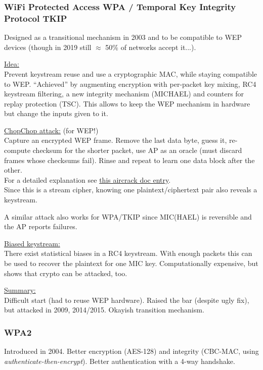 \subsubsection*{WiFi Protected Access WPA / Temporal Key Integrity Protocol TKIP}

Designed as a transitional mechanism in 2003 and to be compatible to WEP devices (though in 2019 still $\approx$ 50\% of networks accept it...).

\underline{Idea:}\\
Prevent keystream reuse and use a cryptographic MAC, while staying compatible to WEP.
``Achieved'' by augmenting encryption with per-packet key mixing, RC4 keystream filtering, a new integrity mechanism (MICHAEL) and counters for replay protection (TSC).
This allows to keep the WEP mechanism in hardware but change the inputs given to it.

\underline{ChopChop attack:} (for WEP!) \\
Capture an encrypted WEP frame.
Remove the last data byte, guess it, re-compute checksum for the shorter packet, use AP as an oracle (must discard frames whose checksums fail).
Rinse and repeat to learn one data block after the other.
\\
For a detailed explanation see \href{https://www.aircrack-ng.org/doku.php?id=chopchoptheory}{this aircrack doc entry}.
\\
Since this is a stream cipher, knowing one plaintext/ciphertext pair also reveals a keystream.

A similar attack also works for WPA/TKIP since MIC(HAEL) is reversible and the AP reports failures.

\underline{Biased keystream:} \\
There exist statistical biases in a RC4 keystream.
With enough packets this can be used to recover the plaintext for one MIC key.
Computationally expensive, but shows that crypto can be attacked, too.

\underline{Summary:}\\
Difficult start (had to reuse WEP hardware).
Raised the bar (despite ugly fix), but attacked in 2009, 2014/2015.
Okayish transition mechanism.


\subsubsection*{WPA2}

Introduced in 2004.
Better encryption (AES-128) and integrity (CBC-MAC, using \textit{authenticate-then-encrypt}).
Better authentication with a 4-way handshake.

